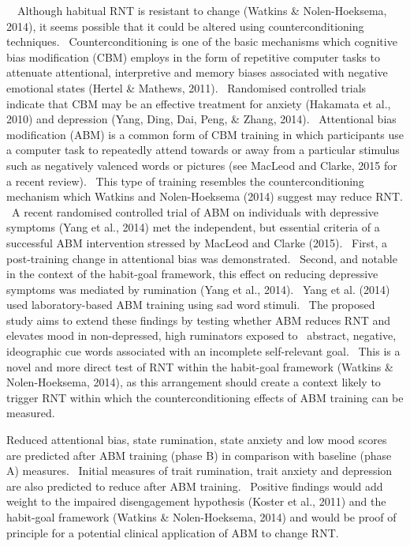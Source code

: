 \documentclass[man,a4paper]{apa6}
\begin{document}
\ \ Although habitual RNT is resistant to change (Watkins \& Nolen-Hoeksema, 2014), it seems possible that it could be altered using counterconditioning techniques. \ Counterconditioning is one of the basic mechanisms which cognitive bias modification (CBM) employs in the form of repetitive computer tasks to attenuate attentional, interpretive and memory biases associated with negative emotional states (Hertel \& Mathews, 2011). \ Randomised controlled trials indicate that CBM may be an effective treatment for anxiety (Hakamata et al., 2010) and depression (Yang, Ding, Dai, Peng, \& Zhang, 2014). \ Attentional bias modification (ABM) is a common form of CBM training in which participants use a computer task to repeatedly attend towards or away from a particular stimulus such as negatively valenced words or pictures (see MacLeod and Clarke, 2015 for a recent review). \ This type of training resembles the counterconditioning mechanism which Watkins and Nolen-Hoeksema (2014) suggest may reduce RNT. \ A recent randomised controlled trial of ABM on individuals with depressive symptoms (Yang et al., 2014) met the independent, but essential criteria of a successful ABM intervention stressed by MacLeod and Clarke (2015). \ First, a post-training change in attentional bias was demonstrated. \ Second, and notable in the context of the habit-goal framework, this effect on reducing depressive symptoms was mediated by rumination (Yang et al., 2014). \ Yang et al. (2014) used laboratory-based ABM training using sad word stimuli. \ The proposed study aims to extend these findings by testing whether ABM reduces RNT and elevates mood in non-depressed, high ruminators exposed to \ abstract, negative, ideographic cue words associated with an incomplete self-relevant goal. \ This is a novel and more direct test of RNT within the habit-goal framework (Watkins \& Nolen-Hoeksema, 2014), as this arrangement should create a context likely to trigger RNT within which the counterconditioning effects of ABM training can be measured.

Reduced attentional bias, state rumination, state anxiety and low mood scores are predicted after ABM training (phase B) in comparison with baseline (phase A) measures. \ Initial measures of trait rumination, trait anxiety and depression are also predicted to reduce after ABM training. \ Positive findings would add weight to the impaired disengagement hypothesis (Koster et al., 2011) and the habit-goal framework (Watkins \& Nolen-Hoeksema, 2014) and would be proof of principle for a potential clinical application of ABM to change RNT.
\end{document}
